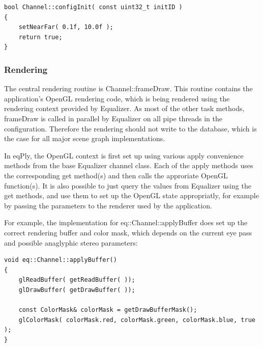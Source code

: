 \documentclass[10pt,a4]{scrartcl}
\begin{document}
{\footnotesize\begin{lstlisting}
bool Channel::configInit( const uint32_t initID )
{
    setNearFar( 0.1f, 10.0f );
    return true;
}
\end{lstlisting}}

\subsubsection{Rendering}

The central rendering routine is \textsf{Channel::frameDraw}. This
routine contains the application's OpenGL rendering code, which is being
rendered using the rendering context provided by Equalizer. As most of
the other task methods, \textsf{frameDraw} is called in parallel by
Equalizer on all pipe threads in the configuration. Therefore the
rendering should not write to the database, which is the case for all
major scene graph implementations.

In \textsf{eqPly}, the OpenGL context is first set up using various
\textsf{apply} convenience methods from the base Equalizer channel
class. Each of the \textsf{apply} methods uses the corresponding
\textsf{get} method(s) and then calls the approriate OpenGL
function(s). It is also possible to just query the values from Equalizer
using the \textsf{get} methods, and use them to set up the OpenGL state
appropriatly, for example by passing the parameters to the renderer used
by the application.

For example, the implementation for \textsf{eq::Channel::applyBuffer}
does set up the correct rendering buffer and color mask, which depends
on the current eye pass and possible anaglyphic stereo parameters:

{\footnotesize\begin{lstlisting}
void eq::Channel::applyBuffer()
{
    glReadBuffer( getReadBuffer( ));
    glDrawBuffer( getDrawBuffer( ));
    
    const ColorMask& colorMask = getDrawBufferMask();
    glColorMask( colorMask.red, colorMask.green, colorMask.blue, true );
}
\end{lstlisting}}
\end{document}
